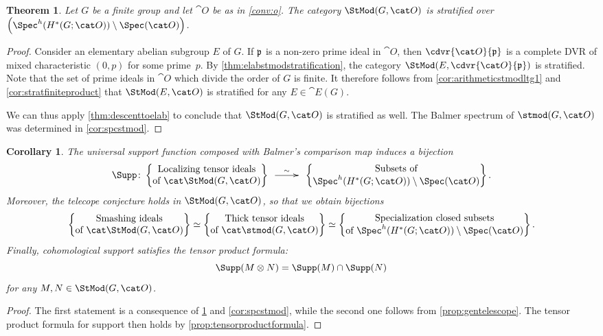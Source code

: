 \documentclass{amsart}%
\numberwithin{equation}{section}%
\newtheorem{Thm}[equation]{Theorem}
\newtheorem{Cor}[equation]{Corollary}
\theoremstyle{remark}
\begin{document}
\begin{Thm}\label{thm:stratstmod}
Let $G$ be a finite group and let $\cat O$ be as in \cref{conv:o}. The category $\StMod(G,\cat O)$ is stratified over $\left(\Spec^h(H^*(G;\cat O))\setminus\Spec(\cat O)\right)$.
\end{Thm}
\begin{proof}
Consider an elementary abelian subgroup $E$ of $G$. If $\frak p$ is a non-zero prime ideal in $\cat O$, then $\cdvr{\cat O}{\frak p}$ is a complete DVR of mixed characteristic $(0,p)$ for some prime~$p$. By \cref{thm:elabstmodstratification}, the category $\StMod(E,\cdvr{\cat O}{\frak p})$ is stratified. Note that the set of prime ideals in $\cat O$ which divide the order of $G$ is finite. It therefore follows from \cref{cor:arithmeticstmodltg1} and \cref{cor:stratfiniteproduct} that $\StMod(E,\cat O)$ is stratified for any $E \in \cat E(G)$.

We can thus apply \cref{thm:descenttoelab} to conclude that $\StMod(G,\cat O)$ is stratified as well. The Balmer spectrum of $\stmod(G,\cat O)$ was determined in \cref{cor:spcstmod}.
\end{proof}

\begin{Cor}\label{cor:stratstmod}
The universal support function composed with Balmer's comparison map induces a bijection
\[
\Supp\colon\begin{Bmatrix}
\text{Localizing tensor ideals} \\
\text{of } \cat \StMod(G,\cat O)
\end{Bmatrix} 
\xymatrix@C=2pc{ \ar[r]^-{\sim} &}
\begin{Bmatrix}
\text{Subsets of}  \\
\Spec^h(H^*(G;\cat O))\setminus\Spec(\cat O)
\end{Bmatrix}.
\]
Moreover, the telecope conjecture holds in $\StMod(G,\cat O)$, so that we obtain bijections
\[
\begin{Bmatrix}
\text{Smashing ideals} \\
\text{of } \cat \StMod(G,\cat O)
\end{Bmatrix} 
\simeq
\begin{Bmatrix}
\text{Thick tensor ideals} \\
\text{of } \cat \stmod(G,\cat O)
\end{Bmatrix} 
\simeq
\begin{Bmatrix}
\text{Specialization closed subsets}  \\
\text{of }\Spec^h(H^*(G;\cat O))\setminus\Spec(\cat O)
\end{Bmatrix}.
\]
Finally, cohomological support satisfies the tensor product formula:
\[
\Supp(M \otimes N) = \Supp(M) \cap \Supp(N)
\]
for any $M,N \in \StMod(G,\cat O)$.
\end{Cor}
\begin{proof}
The first statement is a consequence of \cref{thm:stratstmod} and \cref{cor:spcstmod}, while the second one follows from  \cref{prop:gentelescope}. The tensor product formula for support then holds by \cref{prop:tensorproductformula}. 
\end{proof}
\end{document}
